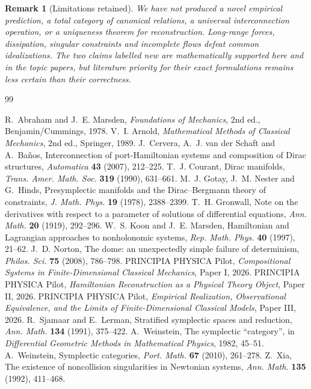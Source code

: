 \documentclass[12pt,a4paper]{article}
\theoremstyle{definition}
\theoremstyle{plain}
\theoremstyle{commentary}
\newtheorem{remark}[definition]{Remark}
\begin{document}
\begin{remark}[Limitations retained]
We have not produced a novel empirical prediction, a total category of canonical relations, a
universal interconnection operation, or a uniqueness theorem for reconstruction.  Long-range
forces, dissipation, singular constraints and incomplete flows defeat common idealizations.
The two claims labelled new are mathematically supported here and in the topic papers, but
literature priority for their exact formulations remains less certain than their correctness.
\end{remark}

\begin{thebibliography}{99}\small\raggedright
{} R.~Abraham and J.~E. Marsden, \emph{Foundations of Mechanics}, 2nd ed., Benjamin/Cummings, 1978.
 V.~I. Arnold, \emph{Mathematical Methods of Classical Mechanics}, 2nd ed., Springer, 1989.
 J.~Cervera, A.~J. van der Schaft and A.~Ba\~nos, Interconnection of port-Hamiltonian systems and composition of Dirac structures, \emph{Automatica} \textbf{43} (2007), 212--225.
 T.~J. Courant, Dirac manifolds, \emph{Trans. Amer. Math. Soc.} \textbf{319} (1990), 631--661.
 M.~J. Gotay, J.~M. Nester and G.~Hinds, Presymplectic manifolds and the Dirac--Bergmann theory of constraints, \emph{J. Math. Phys.} \textbf{19} (1978), 2388--2399.
 T.~H. Gronwall, Note on the derivatives with respect to a parameter of solutions of differential equations, \emph{Ann. Math.} \textbf{20} (1919), 292--296.
 W.~S. Koon and J.~E. Marsden, Hamiltonian and Lagrangian approaches to nonholonomic systems, \emph{Rep. Math. Phys.} \textbf{40} (1997), 21--62.
 J.~D. Norton, The dome: an unexpectedly simple failure of determinism, \emph{Philos. Sci.} \textbf{75} (2008), 786--798.
 PRINCIPIA PHYSICA Pilot, \emph{Compositional Systems in Finite-Dimensional Classical Mechanics}, Paper I, 2026.
 PRINCIPIA PHYSICA Pilot, \emph{Hamiltonian Reconstruction as a Physical Theory Object}, Paper II, 2026.
 PRINCIPIA PHYSICA Pilot, \emph{Empirical Realization, Observational Equivalence, and the Limits of Finite-Dimensional Classical Models}, Paper III, 2026.
 R.~Sjamaar and E.~Lerman, Stratified symplectic spaces and reduction, \emph{Ann. Math.} \textbf{134} (1991), 375--422.
 A.~Weinstein, The symplectic ``category'', in \emph{Differential Geometric Methods in Mathematical Physics}, 1982, 45--51.
 A.~Weinstein, Symplectic categories, \emph{Port. Math.} \textbf{67} (2010), 261--278.
 Z.~Xia, The existence of noncollision singularities in Newtonian systems, \emph{Ann. Math.} \textbf{135} (1992), 411--468.
\end{thebibliography}
\end{document}
